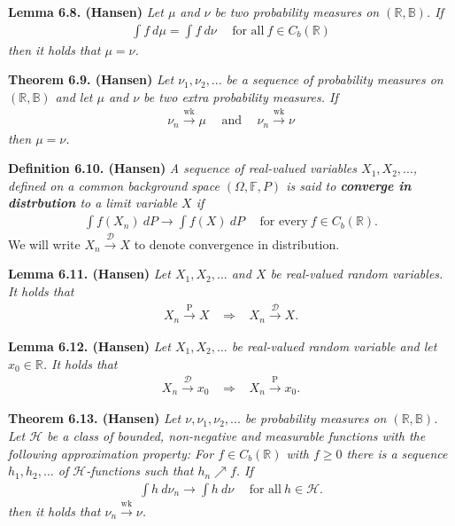 \documentclass[
]{book}
\begin{document}
\textbf{Lemma 6.8. (Hansen)} \emph{Let \(\mu\) and \(\nu\) be two probability measures on \((\mathbb{R},\mathbb{B})\). If}
\begin{align*}
    \int f\ d\mu=\int f\ d\nu\hspace{15pt}\text{for all}\ f\in C_b(\mathbb{R})\tag{6.7}
\end{align*}
\emph{then it holds that \(\mu=\nu\).}

\textbf{Theorem 6.9. (Hansen)} \emph{Let \(\nu_1,\nu_2,...\) be a sequence of probability measures on \((\mathbb{R},\mathbb{B})\) and let \(\mu\) and \(\nu\) be two extra probability measures. If}
\begin{align*}
    \nu_n\stackrel{\text{wk}}{\to} \mu\hspace{15pt}\text{and}\hspace{15pt}\nu_n\stackrel{\text{wk}}{\to} \nu
\end{align*}
\emph{then \(\mu=\nu\).}

\textbf{Definition 6.10. (Hansen)} \emph{A sequence of real-valued variables \(X_1,X_2,...\), defined on a common background space \((\Omega,\mathbb{F},P)\) is said to \textbf{converge in distrbution} to a limit variable \(X\) if}
\begin{align*}
    \int f(X_n)\ dP\to \int f(X)\ dP\hspace{15pt}\text{for every}\ f\in C_b(\mathbb{R}).\tag{6.9}
\end{align*}
We will write \(X_n\stackrel{\mathcal{D}}{\to} X\) to denote convergence in distribution.

\textbf{Lemma 6.11. (Hansen)} \emph{Let \(X_1,X_2,...\) and \(X\) be real-valued random variables. It holds that}
\begin{align*}
    X_n\stackrel{\text{P}}{\to} X\hspace{10pt}\Rightarrow\hspace{10pt} X_n\stackrel{\mathcal{D}}{\to} X.
\end{align*}

\textbf{Lemma 6.12. (Hansen)} \emph{Let \(X_1,X_2,...\) be real-valued random variable and let \(x_0\in\mathbb{R}\). It holds that}
\begin{align*}
    X_n\stackrel{\mathcal{D}}{\to} x_0\hspace{10pt}\Rightarrow\hspace{10pt} X_n\stackrel{\text{P}}{\to} x_0.
\end{align*}

\textbf{Theorem 6.13. (Hansen)} \emph{Let \(\nu,\nu_1,\nu_2,...\) be probability measures on \((\mathbb{R},\mathbb{B})\). Let \(\mathcal{H}\) be a class of bounded, non-negative and measurable functions with the following approximation property: For \(f\in C_b(\mathbb{R})\) with \(f\ge 0\) there is a sequence \(h_1,h_2,...\) of \(\mathcal{H}\)-functions such that \(h_n\nearrow f\). If}
\begin{align*}
    \int h\ d\nu_n\to \int h\ d\nu\hspace{15pt}\text{for all}\ h\in\mathcal{H}.\tag{6.11}
\end{align*}
\emph{then it holds that \(\nu_n\stackrel{\text{wk}}{\to} \nu\).}
\end{document}

